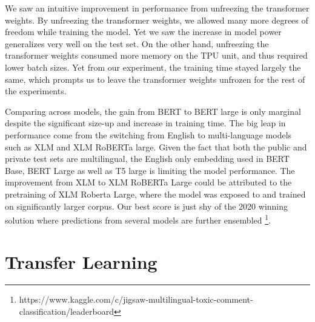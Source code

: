\documentclass[11pt,a4paper]{article}
\begin{document}
We saw an intuitive improvement in performance from unfreezing the transformer weights. By unfreezing the transformer weights, we allowed many more degrees of freedom while training the model. Yet we saw the increase in model power generalizes very well on the test set. On the other hand, unfreezing the transformer weights consumed more memory on the TPU unit, and thus required lower batch sizes. Yet from our experiment, the training time stayed largely the same, which prompts us to leave the transformer weights unfrozen for the rest of the experiments. 

Comparing across models, the gain from BERT to BERT large is only marginal despite the significant size-up and increase in training time. The big leap in performance come from the switching from English to multi-language models such as XLM and XLM RoBERTa large. Given the fact that both the public and private test sets are multilingual, the English only embedding used in BERT Base, BERT Large as well as T5 large is limiting the model performance. The improvement from XLM to XLM RoBERTa Large could be attributed to the pretraining of XLM Roberta Large, where the model was exposed to and trained on significantly larger corpus. Our best score is just shy of the 2020 winning solution where predictions from several models are further ensembled \footnote{https://www.kaggle.com/c/jigsaw-multilingual-toxic-comment-classification/leaderboard}.

\section{Transfer Learning}
\end{document}
